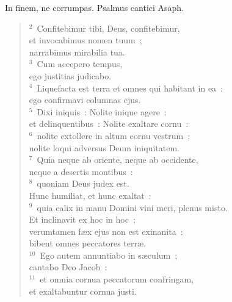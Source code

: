 \lettrine[lines=3,image=true,loversize=0.05,lraise=-0.03]{I}{}n finem, ne corrumpas. Psalmus cantici Asaph.
\begin{flushleft}\begin{verse}\vspace{6pt}${}^{2}$~Confitebimur tibi, Deus, confitebimur,\\ et invocabimus nomen tuum~;\\ narrabimus mirabilia tua.\\
${}^{3}$~Cum accepero tempus,\\ ego justitias judicabo.\\
${}^{4}$~Liquefacta est terra et omnes qui habitant in ea~:\\ ego confirmavi columnas ejus.\\
${}^{5}$~Dixi iniquis~: Nolite inique agere~:\\ et delinquentibus~: Nolite exaltare cornu~:\\
${}^{6}$~nolite extollere in altum cornu vestrum~;\\ nolite loqui adversus Deum iniquitatem.\\
${}^{7}$~Quia neque ab oriente, neque ab occidente,\\ neque a desertis montibus~:\\
${}^{8}$~quoniam Deus judex est.\\ Hunc humiliat, et hunc exaltat~:\\
${}^{9}$~quia calix in manu Domini vini meri, plenus misto.\\ Et inclinavit ex hoc in hoc~;\\ verumtamen f\ae x ejus non est exinanita~:\\ bibent omnes peccatores terr\ae .\\
${}^{10}$~Ego autem annuntiabo in s\ae culum~;\\ cantabo Deo Jacob~:\\
${}^{11}$~et omnia cornua peccatorum confringam,\\ et exaltabuntur cornua justi.\end{verse}\end{flushleft}



